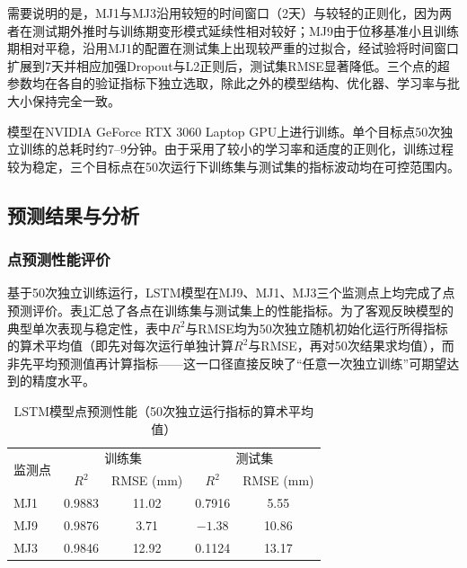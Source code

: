\documentclass[12pt,a4paper]{article}
\newcommand{\tabcaption}[2]{%
  \caption[#1]{{\CJKfamily{songbold}#1}}}
\begin{document}
需要说明的是，MJ1与MJ3沿用较短的时间窗口（2天）与较轻的正则化，因为两者在测试期外推时与训练期变形模式延续性相对较好；MJ9由于位移基准小且训练期相对平稳，沿用MJ1的配置在测试集上出现较严重的过拟合，经试验将时间窗口扩展到7天并相应加强Dropout与L2正则后，测试集RMSE显著降低。三个点的超参数均在各自的验证指标下独立选取，除此之外的模型结构、优化器、学习率与批大小保持完全一致。

模型在NVIDIA GeForce RTX 3060 Laptop GPU上进行训练。单个目标点50次独立训练的总耗时约7--9分钟。由于采用了较小的学习率和适度的正则化，训练过程较为稳定，三个目标点在50次运行下训练集与测试集的指标波动均在可控范围内。

\subsection{预测结果与分析}

\subsubsection{点预测性能评价}

基于50次独立训练运行，LSTM模型在MJ9、MJ1、MJ3三个监测点上均完成了点预测评价。表\ref{tab:lstm-point-prediction}汇总了各点在训练集与测试集上的性能指标。为了客观反映模型的典型单次表现与稳定性，表中$R^2$与RMSE均为50次独立随机初始化运行所得指标的算术平均值（即先对每次运行单独计算$R^2$与RMSE，再对50次结果求均值），而非先平均预测值再计算指标——这一口径直接反映了“任意一次独立训练”可期望达到的精度水平。

\begin{table}[htbp]
\centering
\tabcaption{LSTM模型点预测性能（50次独立运行指标的算术平均值）}{Point Prediction Performance of LSTM Model (Arithmetic Mean of Metrics over 50 Independent Runs)}
\label{tab:lstm-point-prediction}
\begin{tabular}{lcccc}
\toprule
\multirow{2}{*}{监测点} & \multicolumn{2}{c}{训练集} & \multicolumn{2}{c}{测试集} \\
\cmidrule(lr){2-3} \cmidrule(lr){4-5}
 & $R^2$ & RMSE (mm) & $R^2$ & RMSE (mm) \\
\midrule
MJ1 & 0.9883 & 11.02 & 0.7916 & 5.55 \\
MJ9 & 0.9876 & 3.71  & $-1.38$ & 10.86 \\
MJ3 & 0.9846 & 12.92 & 0.1124 & 13.17 \\
\bottomrule
\end{tabular}
\end{table}
\end{document}
